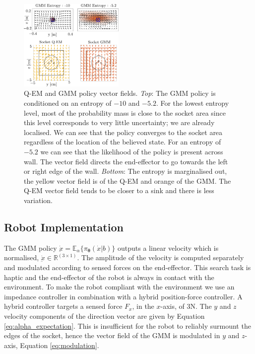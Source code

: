 \documentclass[final,3p,times,twocolumn]{elsarticle}
\newcommand{\Param}{\boldsymbol{\theta}}
\begin{document}
\begin{figure}
   \includegraphics[width=0.45\textwidth]{./Figures/Fig/policy_vf.pdf}
  \caption{Q-EM and GMM policy vector fields. \textit{Top}: The GMM policy is conditioned on an entropy of $-10$ and $-5.2$. For the lowest entropy level,
  most of the probability mass is close to the socket area since this level corresponds to very little uncertainty; we are already localised. We can see 
  that the policy converges to the socket area regardless of the location of the believed state. For an entropy of $-5.2$ we can see that 
  the likelihood of the policy is present across wall. The vector field directs the end-effector to go towards the left or right edge of the wall. 
  \textit{Bottom}: The entropy is marginalised out, the yellow vector field is of the Q-EM and orange of the GMM. The Q-EM vector field tends 
  to be closer to a sink and there is less variation.}
  \label{fig:policy_vf}
\end{figure}


\subsection{Robot Implementation}

The GMM policy $\dot{\underbar{x}} = \mathbb{E}_{\alpha}\{\pi_{\Param}(\dot{x}|b)\}$ outputs a linear velocity which 
is normalised, $\dot{\underbar{x}} \in \mathbb{R}^{(3 \times 1)}$. The amplitude of the velocity is computed separately and 
modulated according to sensed forces on the end-effector.
This search task is haptic and the end-effector of the robot is always in contact with the environment. To make the robot
compliant with the environment we use an impedance controller in combination with a hybrid position-force controller. A hybrid controller
targets a sensed force $F_x$, in the $x$-axis, of 3N. The $y$ and $z$ velocity components of the direction vector are given by 
Equation \ref{eq:alpha_expectation}. This is insufficient for the robot to reliably surmount the edges of the socket,
hence the vector field of the GMM is modulated in $y$ and $z$-axis, Equation \ref{eq:modulation}.
\end{document}
